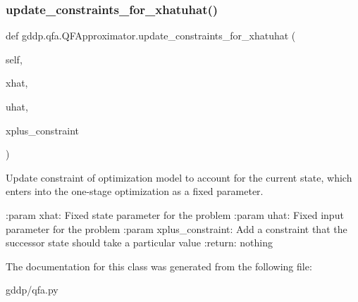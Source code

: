\subsubsection{\texorpdfstring{update\_constraints\_for\_xhatuhat()}{update\_constraints\_for\_xhatuhat()}}
{\footnotesize\ttfamily def gddp.\+qfa.\+Q\+F\+Approximator.\+update\+\_\+constraints\+\_\+for\+\_\+xhatuhat (\begin{DoxyParamCaption}\item[{}]{self,  }\item[{}]{xhat,  }\item[{}]{uhat,  }\item[{}]{xplus\+\_\+constraint }\end{DoxyParamCaption})}

\begin{DoxyVerb}Update constraint of optimization model to account for the current state, which enters
into the one-stage optimization as a fixed parameter.

:param xhat: Fixed state parameter for the problem
:param uhat: Fixed input parameter for the problem
:param xplus_constraint: Add a constraint that the successor state should take a particular
value
:return: nothing
\end{DoxyVerb}
 

The documentation for this class was generated from the following file\+:\begin{DoxyCompactItemize}
\item 
gddp/qfa.\+py\end{DoxyCompactItemize}
